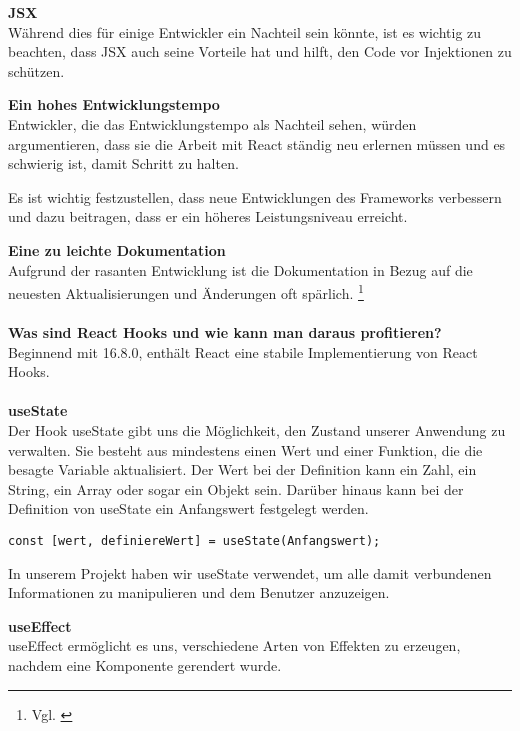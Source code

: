 \textbf{JSX}\\
Während dies für einige Entwickler ein Nachteil sein könnte, ist es wichtig zu beachten, dass JSX auch seine Vorteile hat und hilft, den Code vor Injektionen zu schützen.
\newline

\newpage
\textbf{Ein hohes Entwicklungstempo}\\
Entwickler, die das Entwicklungstempo als Nachteil sehen, würden argumentieren, dass sie die Arbeit mit React ständig neu erlernen müssen und es schwierig ist, damit Schritt zu halten.

Es ist wichtig festzustellen, dass neue Entwicklungen des Frameworks verbessern und dazu beitragen, dass er ein höheres Leistungsniveau erreicht. 
\newline

\textbf{Eine zu leichte Dokumentation}\\
Aufgrund der rasanten Entwicklung ist die Dokumentation in Bezug auf die neuesten Aktualisierungen und Änderungen oft spärlich. 
\footnote{ Vgl. \cite{R01}}

\paragraph{}
\textbf{Was sind React Hooks und wie kann man daraus profitieren?}\\
Beginnend mit 16.8.0, enthält React eine stabile Implementierung von React Hooks.

\paragraph{}
\textbf{useState}\\
Der Hook useState gibt uns die Möglichkeit, den Zustand unserer Anwendung zu verwalten. Sie besteht aus mindestens einen Wert und einer Funktion, die die besagte Variable aktualisiert.
Der Wert bei der Definition kann ein Zahl, ein String, ein Array oder sogar ein Objekt sein.
Darüber hinaus kann bei der Definition von useState ein Anfangswert festgelegt werden.

\begin{lstlisting}
const [wert, definiereWert] = useState(Anfangswert);
\end{lstlisting}

In unserem Projekt haben wir useState verwendet, um alle damit verbundenen Informationen zu manipulieren und dem Benutzer anzuzeigen.

\textbf{useEffect}\\
useEffect ermöglicht es uns, verschiedene Arten von Effekten zu erzeugen, nachdem eine Komponente gerendert wurde. 

